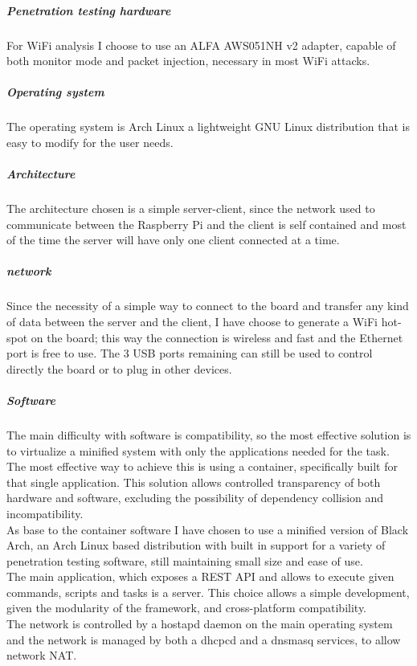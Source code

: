 \documentclass[../PiTest.tex]{subfiles}
\begin{document}
        \subparagraph{Penetration testing hardware}
            For WiFi analysis I choose to use an ALFA AWS051NH v2 adapter, capable of both monitor mode and packet injection, necessary in most WiFi attacks.

        \subparagraph{Operating system}
            The operating system is Arch Linux a lightweight GNU Linux distribution that is easy to modify for the user needs.

        \subparagraph{Architecture}
            The architecture chosen is a simple server-client, since the network used to communicate between the Raspberry Pi and the client is self contained and most of the time the server will have only one client connected at a time.

        \subparagraph{network}
            Since the necessity of a simple way to connect to the board and transfer any kind of data between the server and the client, I have choose to generate a WiFi hot-spot on the board; this way the connection is wireless and fast and the Ethernet port is free to use. The 3 USB ports remaining can still be used to control directly the board or to plug in other devices.

        \subparagraph{Software}
            The main difficulty with software is compatibility, so the most effective solution is to virtualize a minified system with only the applications needed for the task. The most effective way to achieve this is using a \docker container, specifically built for that single application. This solution allows controlled transparency of both hardware and software, excluding the possibility of dependency collision and incompatibility.\\
            As base to the container software I have chosen to use a minified version of Black Arch, an Arch Linux based distribution with built in support for a variety of penetration testing software, still maintaining small size and ease of use. \\
            The main application, which exposes a REST API and allows to execute given commands, scripts and tasks is a \nodejs server. This choice allows a simple development, given the modularity of the framework, and cross-platform compatibility.\\
            The network is controlled by a hostapd daemon on the main operating system and the network is managed by both a dhcpcd and a dnsmasq services, to allow network NAT.


			
\end{document}
